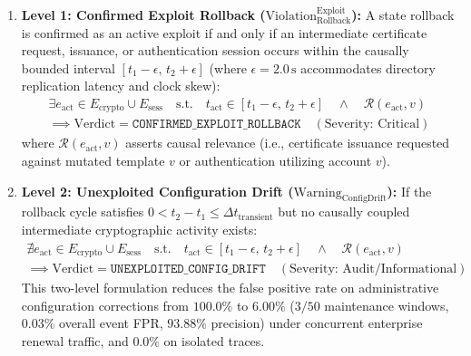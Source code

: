 \begin{enumerate}
    \item \textbf{Level 1: Confirmed Exploit Rollback ($\text{Violation}_{\text{Rollback}}^{\text{Exploit}}$):}
    A state rollback is confirmed as an active exploit if and only if an intermediate certificate request, issuance, or authentication session occurs within the causally bounded interval $[t_1 - \epsilon, \, t_2 + \epsilon]$ (where $\epsilon = 2.0\,\text{s}$ accommodates directory replication latency and clock skew):
    \begin{equation}
    \begin{aligned}
    \exists e_{\text{act}} \in E_{\text{crypto}} \cup E_{\text{sess}} \quad \text{s.t.} \quad t_{\text{act}} \in [t_1 - \epsilon, \, t_2 + \epsilon] \quad \wedge \quad \mathcal{R}(e_{\text{act}}, v) \\
    \implies \text{Verdict} = \texttt{CONFIRMED\_EXPLOIT\_ROLLBACK} \quad (\text{Severity: Critical})
    \end{aligned}
    \end{equation}
    where $\mathcal{R}(e_{\text{act}}, v)$ asserts causal relevance (i.e., certificate issuance requested against mutated template $v$ or authentication utilizing account $v$).
    
    \item \textbf{Level 2: Unexploited Configuration Drift ($\text{Warning}_{\text{ConfigDrift}}$):}
    If the rollback cycle satisfies $0 < t_2 - t_1 \le \Delta t_{\text{transient}}$ but no causally coupled intermediate cryptographic activity exists:
    \begin{equation}
    \begin{aligned}
    \nexists e_{\text{act}} \in E_{\text{crypto}} \cup E_{\text{sess}} \quad \text{s.t.} \quad t_{\text{act}} \in [t_1 - \epsilon, \, t_2 + \epsilon] \quad \wedge \quad \mathcal{R}(e_{\text{act}}, v) \\
    \implies \text{Verdict} = \texttt{UNEXPLOITED\_CONFIG\_DRIFT} \quad (\text{Severity: Audit/Informational})
    \end{aligned}
    \end{equation}
    This two-level formulation reduces the false positive rate on administrative configuration corrections from $100.0\%$ to $6.00\%$ ($3/50$ maintenance windows, $0.03\%$ overall event FPR, $93.88\%$ precision) under concurrent enterprise renewal traffic, and $0.0\%$ on isolated traces.
\end{enumerate}

